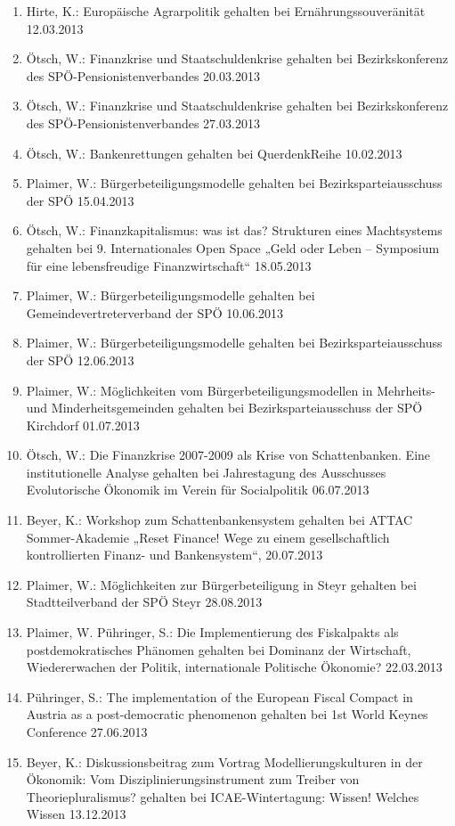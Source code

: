 \begin{enumerate}
	\item Hirte, K.: Europäische Agrarpolitik gehalten bei Ernährungssouveränität 12.03.2013
	\item Ötsch, W.: Finanzkrise und Staatschuldenkrise gehalten bei Bezirkskonferenz des SPÖ-Pensionistenverbandes 20.03.2013
	\item Ötsch, W.: Finanzkrise und Staatschuldenkrise gehalten bei Bezirkskonferenz des SPÖ-Pensionistenverbandes 27.03.2013
	\item Ötsch, W.: Bankenrettungen gehalten bei QuerdenkReihe 10.02.2013
	\item Plaimer, W.: Bürgerbeteiligungsmodelle gehalten bei Bezirksparteiausschuss der SPÖ 15.04.2013
	\item Ötsch, W.: Finanzkapitalismus: was ist das? Strukturen eines Machtsystems gehalten bei 9. Internationales Open Space „Geld oder Leben – Symposium für eine lebensfreudige Finanzwirtschaft“ 18.05.2013
	\item Plaimer, W.: Bürgerbeteiligungsmodelle gehalten bei Gemeindevertreterverband der SPÖ 10.06.2013
	\item Plaimer, W.: Bürgerbeteiligungsmodelle gehalten bei Bezirksparteiausschuss der SPÖ 12.06.2013
	\item Plaimer, W.: Möglichkeiten vom Bürgerbeteiligungsmodellen in Mehrheits- und Minderheitsgemeinden gehalten bei Bezirksparteiausschuss der SPÖ Kirchdorf 01.07.2013
	\item Ötsch, W.: Die Finanzkrise 2007-2009 als Krise von Schattenbanken. Eine institutionelle Analyse gehalten bei Jahrestagung des Ausschusses Evolutorische Ökonomik im Verein für Socialpolitik 06.07.2013
	\item Beyer, K.: Workshop zum Schattenbankensystem gehalten bei ATTAC Sommer-Akademie „Reset Finance! Wege zu einem gesellschaftlich kontrollierten Finanz- und Bankensystem“, 20.07.2013
	\item Plaimer, W.: Möglichkeiten zur Bürgerbeteiligung in Steyr gehalten bei Stadtteilverband der SPÖ Steyr 28.08.2013
	\item Plaimer, W. Pühringer, S.: Die Implementierung des Fiskalpakts als postdemokratisches Phänomen gehalten bei Dominanz der Wirtschaft, Wiedererwachen der Politik, internationale Politische Ökonomie? 22.03.2013
	\item Pühringer, S.: The implementation of the European Fiscal Compact in Austria as a post-democratic phenomenon gehalten bei 1st World Keynes Conference 27.06.2013
	\item Beyer, K.: Diskussionsbeitrag zum Vortrag Modellierungskulturen in der Ökonomik: Vom Disziplinierungsinstrument zum Treiber von Theoriepluralismus? gehalten bei ICAE-Wintertagung: Wissen! Welches Wissen 13.12.2013

\end{enumerate}
